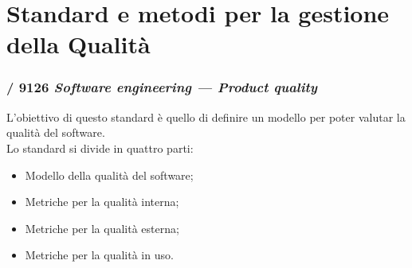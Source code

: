 \section{Standard e metodi per la gestione della Qualità}
  \subsubsection{/ 9126 \emph{Software engineering — Product quality}}
  L'obiettivo di questo standard è quello di definire un modello per poter valutar la qualità del software.\\
  Lo standard si divide in quattro parti:
  \begin{itemize}
    \item Modello della qualità del software;
    \item Metriche per la qualità interna;
    \item Metriche per la qualità esterna;
    \item Metriche per la qualità in uso.
  \end{itemize}
